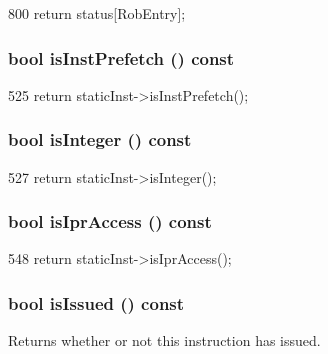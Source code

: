 \begin{DoxyCode}
800 { return status[RobEntry]; }
\end{DoxyCode}
\hypertarget{classBaseDynInst_ab7deedfb63be4690f506acd0444dde3a}{
\subsubsection[{isInstPrefetch}]{\setlength{\rightskip}{0pt plus 5cm}bool isInstPrefetch () const}}
\label{classBaseDynInst_ab7deedfb63be4690f506acd0444dde3a}



\begin{DoxyCode}
525 { return staticInst->isInstPrefetch(); }
\end{DoxyCode}
\hypertarget{classBaseDynInst_a06625615adfaf28305767ac42b1ef0a4}{
\subsubsection[{isInteger}]{\setlength{\rightskip}{0pt plus 5cm}bool isInteger () const}}
\label{classBaseDynInst_a06625615adfaf28305767ac42b1ef0a4}



\begin{DoxyCode}
527 { return staticInst->isInteger(); }
\end{DoxyCode}
\hypertarget{classBaseDynInst_aa201775c9e5befb0bf84cdd7b24519b3}{
\subsubsection[{isIprAccess}]{\setlength{\rightskip}{0pt plus 5cm}bool isIprAccess () const}}
\label{classBaseDynInst_aa201775c9e5befb0bf84cdd7b24519b3}



\begin{DoxyCode}
548 { return staticInst->isIprAccess(); }
\end{DoxyCode}
\hypertarget{classBaseDynInst_a1b4092ba688a1efd54c934a31dd1fd3e}{
\subsubsection[{isIssued}]{\setlength{\rightskip}{0pt plus 5cm}bool isIssued () const}}
\label{classBaseDynInst_a1b4092ba688a1efd54c934a31dd1fd3e}
Returns whether or not this instruction has issued. 


